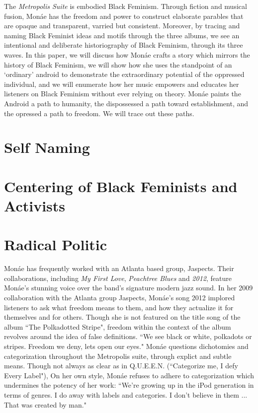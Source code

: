 \documentclass[11pt]{amsart}
\begin{document}
The \emph{Metropolis Suite} is embodied Black Feminism.
Through fiction and musical fusion, Mon\'ae has the freedom and power to construct elaborate parables that are opaque and transparent, varried but consistent.
Moreover, by tracing and naming Black Feminist ideas and motifs through the three albums, we see an intentional and deliberate historiography of Black Feminism, through its three waves.
In this paper, we will discuss how Mon\'ae crafts a story which mirrors the history of Black Feminism, we will show how she uses the standpoint of an `ordinary' android to demonstrate the extraordinary potential of the oppressed individual, and we will enumerate how her music empowers and educates her listeners on Black Feminism without ever relying on theory.
Mon\'ae paints the Android a path to humanity, the dispossessed a path toward establishment, and the opressed a path to freedom.
We will trace out these paths. 

\section{Self Naming}


\section{Centering of Black Feminists and Activists}


\section{Radical Politic}




Mon\'ae has frequently worked with an Atlanta based group, Jaspects.
Their collaborations, including \emph{My First Love}, \emph{Peachtree Blues} and \emph{2012}, feature Mon\'ae's stunning voice over the band's signature modern jazz sound\cite{peachtreeblues}\cite{mytruelove}.
In her 2009 collaboration with the Atlanta group Jaspects, Mon\'ae's song 2012 implored listeners to ask what freedom means to them, and how they actualize it for themselves and for others.
Though she is not featured on the title song of the album ``The Polkadotted Stripe", freedom within the context of the album revolves around the idea of false definitions.
``We see black or white, polkadots or stripes. Freedom we deny, lets open our eyes."\cite{polkadottedstripe}
Mon\'ae questions dichotomies and categorization throughout the Metropolis suite, through explict and subtle means.
Though not always as clear as in Q.U.E.E.N. (``Categorize me, I defy Every Label"\cite{queen}), 
On her own style, Mon\'ae refuses to adhere to categorization which undermines the potency of her work:
``We’re growing up in the iPod generation in terms of genres. I do away with labels and categories. I don’t believe in them ... That was created by man."\cite{chronreview}
\end{document}
